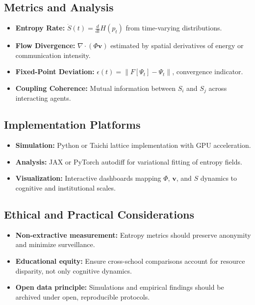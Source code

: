 \documentclass[12pt,a4paper]{article}
\begin{document}
\subsection{Metrics and Analysis}

\begin{itemize}[leftmargin=1.2em]
  \item \textbf{Entropy Rate:} $\dot S(t) = \frac{d}{dt}H(p_t)$ from time-varying distributions.
  \item \textbf{Flow Divergence:} $\nabla\!\cdot(\Phi\mathbf{v})$ estimated by spatial derivatives of energy or communication intensity.
  \item \textbf{Fixed-Point Deviation:} $\epsilon(t)=\|F[\Psi_t]-\Psi_t\|$, convergence indicator.
  \item \textbf{Coupling Coherence:} Mutual information between $S_i$ and $S_j$ across interacting agents.
\end{itemize}

\subsection{Implementation Platforms}

\begin{itemize}[leftmargin=1.2em]
  \item \textbf{Simulation:} Python or Taichi lattice implementation with GPU acceleration.
  \item \textbf{Analysis:} JAX or PyTorch autodiff for variational fitting of entropy fields.
  \item \textbf{Visualization:} Interactive dashboards mapping $\Phi$, $\mathbf{v}$, and $S$ dynamics to cognitive and institutional scales.
\end{itemize}

\subsection{Ethical and Practical Considerations}

\begin{itemize}[leftmargin=1.2em]
  \item \textbf{Non-extractive measurement:} Entropy metrics should preserve anonymity and minimize surveillance.
  \item \textbf{Educational equity:} Ensure cross-school comparisons account for resource disparity, not only cognitive dynamics.
  \item \textbf{Open data principle:} Simulations and empirical findings should be archived under open, reproducible protocols.
\end{itemize}
\end{document}
